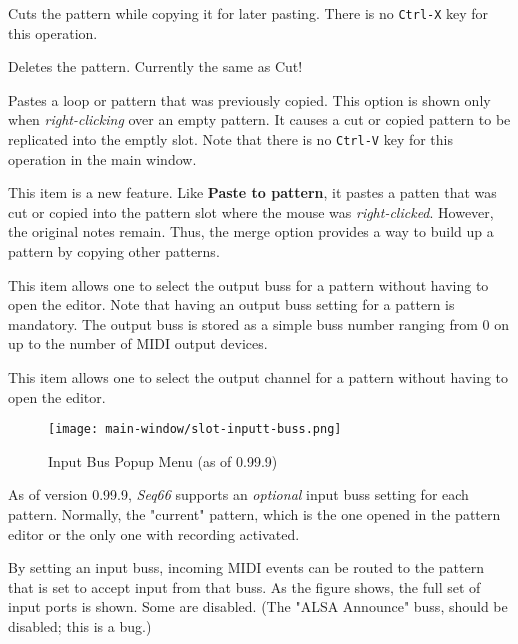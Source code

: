    Cuts the pattern while copying it for later pasting.
   There is no \texttt{Ctrl-X} key for this operation.

   Deletes the pattern.  Currently the same as Cut!

   Pastes a loop or pattern that was previously copied.
   This option is shown only when
   \textsl{right-clicking} over an empty pattern.
   It causes a cut or copied pattern to be replicated into the emptly slot.
   Note that there is no \texttt{Ctrl-V} key for this operation in the
   main window.

   This item is a new feature.  Like \textbf{Paste to pattern}, it pastes a
   patten that was cut or copied into the pattern slot where the mouse was
   \textsl{right-clicked}.  However, the original notes remain.  Thus, the merge
   option provides a way to build up a pattern by copying other patterns.

   This item allows one to select the output buss for a pattern without having
   to open the editor.
   Note that having an output buss setting for a pattern is mandatory.
   The output buss is stored as a simple buss number ranging from 0 on up to
   the number of MIDI output devices.

   This item allows one to select the output channel for a pattern without
   having to open the editor.

\begin{figure}[H]
   \centering 
   \texttt{[image: main-window/slot-inputt-buss.png]}
   \caption{Input Bus Popup Menu (as of 0.99.9)}
   \label{fig:slot_input_bus}
\end{figure}

   As of version 0.99.9, \textsl{Seq66} supports an
   \textsl{optional} input buss setting for each pattern.
   Normally, the "current" pattern, which is the one opened in
   the pattern editor or the only one with recording activated.

   By setting an input buss, incoming MIDI events can be routed to
   the pattern that is set to accept input from that buss.
   As the figure shows, the full set of input ports is shown.
   Some are disabled. (The "ALSA Announce" buss, should be disabled; this
   is a bug.)

